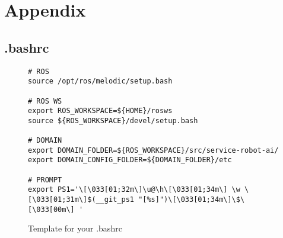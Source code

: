 \appendix
\chapter{Appendix}
\label{chap:Appendix}

\begin{landscape}
  \section{.bashrc}
  \label{sec:bashrc}
  \begin{figure}[htbp]
    \begin{verbatim}
# ROS
source /opt/ros/melodic/setup.bash

# ROS WS
export ROS_WORKSPACE=${HOME}/rosws
source ${ROS_WORKSPACE}/devel/setup.bash

# DOMAIN
export DOMAIN_FOLDER=${ROS_WORKSPACE}/src/service-robot-ai/
export DOMAIN_CONFIG_FOLDER=${DOMAIN_FOLDER}/etc

# PROMPT
export PS1='\[\033[01;32m\]\u@\h\[\033[01;34m\] \w \[\033[01;31m\]$(__git_ps1 "[%s]")\[\033[01;34m\]\$\[\033[00m\] '

    \end{verbatim}
    \caption{Template for your .bashrc}
    \label{fig:template_bashrc}
  \end{figure}
\end{landscape}